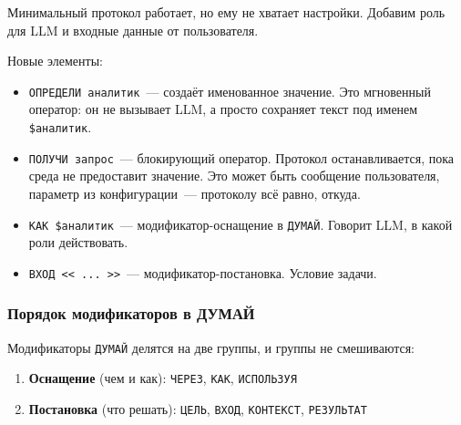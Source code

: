 \documentclass[11pt,a4paper]{article}
\newcommand{\ic}[1]{\texttt{\small #1}}
\begin{document}
Минимальный протокол работает, но ему не хватает настройки. Добавим роль для LLM и входные данные от пользователя.


Новые элементы:

\begin{itemize}[leftmargin=2em]
\item \ic{ОПРЕДЕЛИ аналитик}~--- создаёт именованное значение. Это мгновенный оператор: он не вызывает LLM, а просто сохраняет текст под именем \ic{\$аналитик}.

\item \ic{ПОЛУЧИ запрос}~--- блокирующий оператор. Протокол останавливается, пока среда не предоставит значение. Это может быть сообщение пользователя, параметр из конфигурации~--- протоколу всё равно, откуда.

\item \ic{КАК \$аналитик}~--- модификатор-оснащение в \ic{ДУМАЙ}. Говорит LLM, в какой роли действовать.

\item \ic{ВХОД <{<} ... >{>}}~--- модификатор-постановка. Условие задачи.
\end{itemize}

\subsubsection{Порядок модификаторов в ДУМАЙ}

Модификаторы \ic{ДУМАЙ} делятся на две группы, и группы не смешиваются:

\begin{enumerate}[leftmargin=2em]
\item \textbf{Оснащение} (чем и как):  \ic{ЧЕРЕЗ}, \ic{КАК}, \ic{ИСПОЛЬЗУЯ}
\item \textbf{Постановка} (что решать): \ic{ЦЕЛЬ}, \ic{ВХОД}, \ic{КОНТЕКСТ}, \ic{РЕЗУЛЬТАТ}
\end{enumerate}
\end{document}
